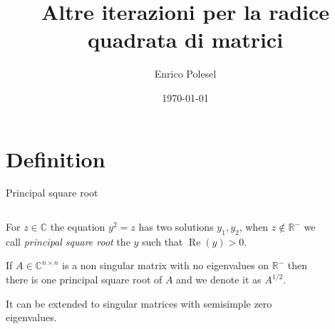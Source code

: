\documentclass{beamer}
\title{Altre iterazioni per la radice quadrata di matrici}
\date{\today}
\author{Enrico Polesel}
\theoremstyle{plain}
\theoremstyle{definition}
\theoremstyle{remark}
\newcommand{\pa}[1]{\left(#1\right)}
\DeclareMathOperator{\re}{Re}
\begin{document}
\maketitle

\section{Definition}

\begin{frame}{Principal square root}
  \begin{columns}[T]
    \begin{column}{.45\textwidth}
      For $z\in \mathbb{C}$ the equation $y^2 = z$ has two solutions $y_1,
      y_2$, when $z\not\in \mathbb{R}^-$ we call \textit{principal
        square root} the $y$ such that $\re\pa{y} >0$.
      \vspace{15pt}
      
      If $A \in \mathbb{C} ^ {n \times n}$ is a non singular matrix
      with no eigenvalues on $\mathbb{R}^-$ then there is one
      principal square root of $A$ and we denote it as $A^{1/2}$.
      \vspace{8pt}

      It can be extended to singular matrices with semisimple zero
      eigenvalues.
    \end{column}
    \begin{column}{.6\textwidth}
      \begin{figure}
      \end{figure}
    \end{column}
  \end{columns}
\end{frame}

  
\end{document}

